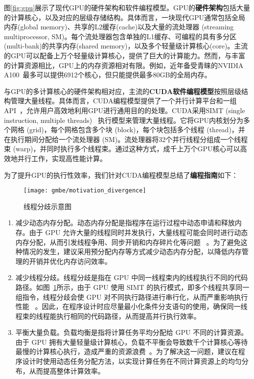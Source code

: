 图\ref{fig:gpu}展示了现代GPU的硬件架构和软件编程模型。GPU的\textbf{硬件架构}包括大量的计算核心，以及对应的层级存储结构。具体而言，一块现代GPU通常包括全局内存(global memory)、共享的L2缓存(cache)以及大量的流处理器 (streaming multiprocessor, SM)。每个流处理器包含单独的L1缓存、可编程的具有多分区(multi-bank)的共享内存(shared memory)，以及多个轻量级计算核心(core)。主流的GPU可以配备上万个轻量级计算核心，提供了巨大的计算能力。然而，与丰富的计算资源相比，GPU上的内存资源相对有限。例如，近年备受青睐的NVIDIA A100~\cite{NVIDIA-A100}最多可以提供6912个核心，但只能提供最多80GB的全局内存。

与GPU的多计算核心的硬件架构相对应，主流的\textbf{CUDA软件编程模型}按照层级结构管理大量线程。具体而言，CUDA编程模型提供了一个并行计算平台和一组API~\cite{CUDA-wiki,CUDAProgrammingGuide}，允许用户高效地利用GPU进行通用目的的处理。CUDA采用SIMT (single instruction, multiple threads)~\cite{SIMT-wiki} 执行模型来管理大量线程。它将GPU内核划分为多个网格 (grid)，每个网格包含多个块 (block)，每个块包括多个线程 (thread)，并在执行期间分配给一个流处理器 (SM)。流处理器将32个并行线程分组成一个线程束 (warp)，并同时执行多个线程束。通过这种方式，成千上万个GPU核心可以高效地并行工作，实现高性能计算。

为了提升GPU的执行性效率，我们针对CUDA编程模型总结了\textbf{编程指南}如下：

\begin{figure} [t]
  \center
		\texttt{[image: gmbe/motivation\_divergence]}
	\caption{线程分歧示意图}
	\label{fig:gmbe_motivation_divergence}
\end{figure}



\begin{enumerate}
  \item 减少动态内存分配。动态内存分配是指程序在运行过程中动态申请和释放内存。由于 GPU 允许大量的线程同时并发执行，大量线程可能会同时进行动态内存分配，从而引发线程争用、同步开销和内存碎片化等问题 ~\cite{DynamicMallocGpu21}。为了避免这种情况的发生，建议采用预分配内存等方式减少动态内存分配，以降低内存管理的开销并优化内存访问效率。
  
  \item 减少线程分歧。线程分歧是指在 GPU 中同一线程束内的线程执行不同的代码路径。如图~\ref{fig:gmbe_motivation_divergence}所示，由于 GPU 使用 SIMT 的执行模式，即多个线程共享同一组指令，线程分歧会使 GPU 对不同执行路径进行串行化，从而严重影响执行性能 ~\cite{CUDAProgrammingGuide}。因此，在程序设计时应尽量最小化条件分支语句的使用，确保同一线程束的线程能执行相同的代码路径，从而提高并行执行效率。

  \item 平衡大量负载。负载均衡是指将计算任务平均分配给 GPU 不同的计算资源。由于 GPU 拥有大量轻量级计算核心，负载不平衡会导致数千个计算核心等待最慢的计算核心执行，造成严重的资源浪费~\cite{CUDAProgrammingGuide}。为了解决这一问题，建议在程序设计时使用动态任务分配方法，以实现计算任务在不同计算资源上的均匀分布，从而提高整体计算效率。
\end{enumerate}


